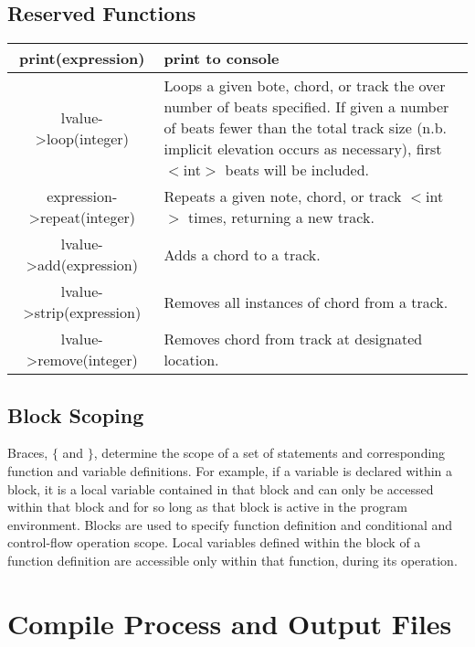 \documentclass[letterpaper]{article}
\begin{document}
\begin{samepage}
\subsection{Reserved Functions}
\begin{table}[H]
\centering
\begin{tabularx}{.75\textwidth}{|c|X|}
\hline
print(expression) & print to console \\
\hline
lvalue-\textgreater loop(integer) & Loops a given bote, chord, or track the over number of beats specified. If given a number of beats fewer than the total track size (n.b. implicit elevation occurs as necessary), first $<$int$>$ beats will be included. \\
\hline
expression-\textgreater repeat(integer) & Repeats a given note, chord, or track $<$int$>$ times, returning a new track. \\
\hline
lvalue-\textgreater add(expression) & Adds a chord to a track. \\
\hline
lvalue-\textgreater strip(expression) & Removes all instances of chord from a track. \\
\hline
lvalue-\textgreater remove(integer) & Removes chord from track at designated location. \\
\hline
\end{tabularx}
\end{table}
\end{samepage}

\subsection{Block Scoping}
Braces, $\{$ and $\}$, determine the scope of a set of statements and corresponding function and variable definitions. For example, if a variable is declared within a block, it is a local variable contained in that block and can only be accessed within that block and for so long as that block is active in the program environment. Blocks are used to specify function definition and conditional and control-flow operation scope. Local variables defined within the block of a function definition are accessible only within that function, during its operation. 

\section{Compile Process and Output Files}
\end{document}
